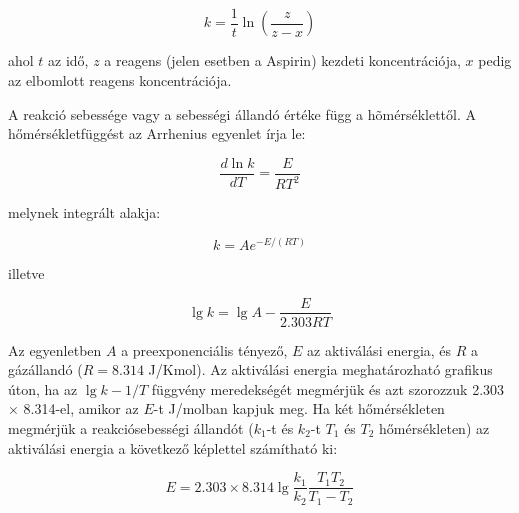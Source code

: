 \documentclass[a4paper, 12pt]{article}
\begin{document}
\begin{equation}
\label{eq:divider}
        k
        =
        \frac
                {1}
                {t}
	\ln(\frac{z}{z-x})
\end{equation}

ahol $t$ az idő, $z$ a reagens (jelen esetben a Aspirin) kezdeti koncentrációja, $x$ pedig az elbomlott reagens koncentrációja.

A reakció sebessége vagy a sebességi állandó értéke függ a hõmérséklettől.
A hőmérsékletfüggést az Arrhenius egyenlet írja le:

\begin{equation}
\label{eq:divider}
        \frac
                {d\ln k}
                {dT}
	=
	\frac
		{E}
		{RT^2}
\end{equation}

melynek integrált alakja:

\begin{equation}
\label{eq:divider}
        k
        =
	A
	e^{-E/(RT)}
\end{equation}

illetve

\begin{equation}
\label{eq:divider}
        \lg k
        =
        \lg A
	-\frac{E}{2.303 RT}
\end{equation}

Az egyenletben $A$ a preexponenciális tényező, $E$ az aktiválási energia, és $R$ a gázállandó ($R = 8.314$ J/Kmol).
Az aktiválási energia meghatározható grafikus úton, ha az $\lg k - 1/T$ függvény meredekségét megmérjük és azt szorozzuk 2.303 $\times$ 8.314-el, amikor az $E$-t J/molban kapjuk meg.
Ha két hőmérsékleten megmérjük a reakciósebességi állandót ($k_1$-t és $k_2$-t $T_1$ és $T_2$ hőmérsékleten) az aktiválási energia a következő képlettel számítható ki:

\begin{equation}
	E
	=
	2.303
	\times
	8.314
	\lg
	\frac{k_1}{k_2}
	\frac{T_1 T_2}{T_1-T_2}
\end{equation}
\end{document}
